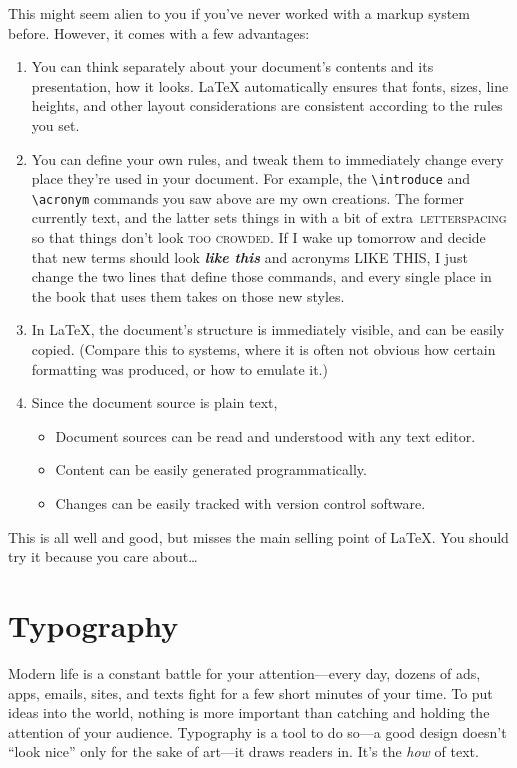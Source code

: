 This might seem alien to you if you've never worked with a markup system before.
However, it comes with a few advantages:
\begin{enumerate}
\item You can think separately about your document's contents and
    its presentation, how it looks.
    \LaTeX{} automatically ensures that fonts, sizes, line heights,
    and other layout considerations are consistent according to the rules you set.
\item You can define your own rules, and tweak them to immediately change
    every place they're used in your document.
    For example, the \verb|\introduce| and \verb|\acronym| commands you saw above
    are my own creations. The former currently  text, and
    the latter sets things in  with a bit of extra
    \,\textsc{letterspacing}\, so that things don't
    look \textsc{too crowded}.
    If I wake up tomorrow and decide that new terms should look
    \textbf{\itshape like this} and acronyms
    {\small{} LIKE THIS},
    I just change the two lines that define those commands,
    and every single place in the book that uses them takes on those new styles.
\item In \LaTeX, the document's structure is immediately visible,
    and can be easily copied.
    (Compare this to  systems, where it is often not obvious
    how certain formatting was produced,
    or how to emulate it.)
\item Since the document source is plain text,
    \begin{itemize}
    \item Document sources can be read and understood with any text editor.
    \item Content can be easily generated programmatically.
    \item Changes can be easily tracked with version control software.
    \end{itemize}
\end{enumerate}

This is all well and good,
but misses the main selling point of \LaTeX.
You should try it because you care about\ldots

\chapter{Typography}

Modern life is a constant battle for your attention---every day,
dozens of ads, apps, emails, sites, and texts fight
for a few short minutes of your time.
To put ideas into the world,
nothing is more important than catching and holding
the attention of your audience.
Typography is a tool to do so---a good design doesn't ``look nice''
only for the sake of art---it draws readers in.\punckern{}
It's the \emph{how} of text.

